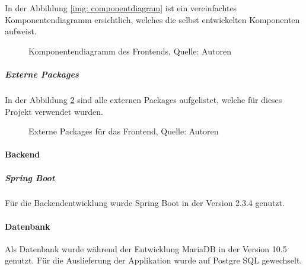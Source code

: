 In der Abbildung \ref{img: componentdiagram} ist ein vereinfachtes Komponentendiagramm ersichtlich, welches die selbst entwickelten Komponenten aufweist.
\begin{figure}[H]
    \centering
    \caption[Komponentendiagramm des Frontends]{Komponentendiagramm des Frontends, Quelle: Autoren}
    \label{img: reactcomponents}
\end{figure}

\subparagraph{Externe Packages}
In der Abbildung \ref{img: reactdependencies} sind alle externen Packages aufgelistet, welche für dieses Projekt verwendet wurden.
\begin{figure}[H]
    \centering
    \caption[Externe Packages für das Frontend]{Externe Packages für das Frontend, Quelle: Autoren}
    \label{img: reactdependencies}
\end{figure}

\paragraph{Backend}
\subparagraph{Spring Boot}
Für die Backendentwicklung wurde Spring Boot in der Version 2.3.4 genutzt.
\paragraph{Datenbank}
Als Datenbank wurde während der Entwicklung MariaDB in der Version 10.5 genutzt.
Für die Auslieferung der Applikation wurde auf Postgre SQL gewechselt.
